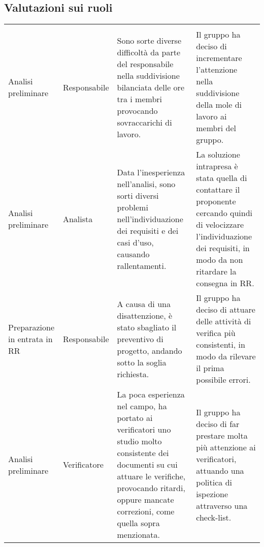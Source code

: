 \documentclass[../piano-di-qualifica.tex]{subfiles}
\begin{document}
\newpage
\subsection{Valutazioni sui ruoli}

\begin{longtable}[H]{>{\centering\arraybackslash}m{3cm} >{\centering\arraybackslash}m{3cm} >{\centering\arraybackslash}m{5cm} >{\centering\arraybackslash}m{5cm}}
  \rowcolor{darkgray!90!}
  \color{white}{\textbf{Fase}}  & \color{white}{\textbf{Ruolo}} & \color{white}{\textbf{Problema}}                                                                                                                                                                              & \color{white}{\textbf{Soluzione}}                                                                                                                                               \\
  Analisi preliminare           & Responsabile                  & Sono sorte diverse difficoltà da parte del responsabile nella suddivisione bilanciata delle ore tra i membri provocando sovraccarichi di lavoro.                                                              & Il gruppo ha deciso di incrementare l'attenzione nella suddivisione della mole di lavoro ai membri del gruppo.                                                                  \\
  Analisi preliminare           & Analista                      & Data l'inesperienza nell'analisi, sono sorti diversi problemi nell'individuazione dei requisiti e dei casi d'uso, causando rallentamenti.                                                                     & La soluzione intrapresa è stata quella di contattare il proponente cercando quindi di velocizzare l'individuazione dei requisiti, in modo da non ritardare la consegna in RR\@. \\
  Preparazione in entrata in RR & Responsabile                  & A causa di una disattenzione, è stato sbagliato il preventivo di progetto, andando sotto la soglia richiesta.                                                                                                 & Il gruppo ha deciso di attuare delle attività di verifica più consistenti, in modo da rilevare il prima possibile errori.                                                       \\
  Analisi preliminare           & Verificatore                  & La poca esperienza nel campo, ha portato ai verificatori uno studio molto consistente dei documenti su cui attuare le verifiche, provocando ritardi, oppure mancate correzioni, come quella sopra menzionata. & Il gruppo ha deciso di far prestare molta più attenzione ai verificatori, attuando una politica di ispezione attraverso una check-list.                                         \\

\end{longtable}
\end{document}
